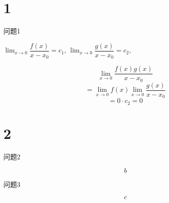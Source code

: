 \documentclass[ebook,fleqn]{problemset}
\begin{document}
\listoftodos %
\tableofcontents %
\chapter{1}
\begin{problem}
  问题1
\end{problem}

\begin{solution}
  $\lim_{x \to 0} \dfrac{f(x)}{x-x_0} = c_1$,
  $\lim_{x \to 0} \dfrac{g(x)}{x-x_0} = c_2$,

  \[
    \lim_{x\to0} \dfrac{f(x)g(x)}{x-x_0}
  \]
  \[
   = \lim_{x\to0} f(x) \lim_{x \to 0} \dfrac{g(x)}{x-x_0}
  \]
  \[
    = 0 \cdot c_2 = 0
  \]
\end{solution}
\chapter{2}

\begin{problem}
  问题2
\end{problem}
\begin{solution}
    \[b\]
\end{solution}
\begin{problem}
  问题3
\end{problem}
\begin{solution}
    \[c\]
\end{solution}
\end{document}
